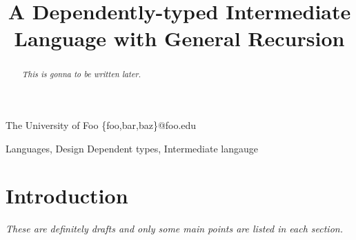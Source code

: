 \documentclass[preprint]{sigplanconf}
\begin{document}
\setlength{\pdfpageheight}{\paperheight}
\setlength{\pdfpagewidth}{\paperwidth}


\preprintfooter{} %

\title{A Dependently-typed Intermediate Language with General Recursion}
\subtitle{}

           {The University of Foo}
           {\{foo,bar,baz\}@foo.edu}

\maketitle

\begin{abstract}
\emph{This is gonna to be written later.}
\end{abstract}

\terms Languages, Design
\keywords Dependent types, Intermediate langauge


\section{Introduction}
\emph{These are definitely drafts and only some main points are listed in each section.}
\end{document}
